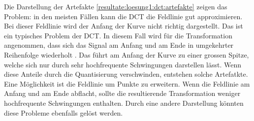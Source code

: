 Die Darstellung der Artefakte \ref{resultate:loesung1:dct:artefakte} zeigen das Problem: in den meisten Fällen kann die DCT die Feldlinie gut approximieren. Bei dieser Feldlinie wird der Anfang der Kurve nicht richtig dargestellt. Das ist ein typisches Problem der DCT. In diesem Fall wird für die Transformation angenommen, dass sich das Signal am Anfang und am Ende in umgekehrter Reihenfolge wiederholt \cite{wiki:dct}. Das führt am Anfang der Kurve zu einer grossen Spitze, welche sich nur durch sehr hochfrequente Schwingungen darstellen lässt.  Wenn diese Anteile durch die Quantisierung verschwinden, entstehen solche Artefatkte.\\
Eine Möglichkeit ist die Feldlinie um Punkte zu erweitern. Wenn die Feldlinie am Anfang und am Ende abflacht, sollte die resultierende Transformation weniger hochfrequente Schwingungen enthalten. Durch eine andere Darstellung könnten diese Probleme ebenfalls gelöst werden.

